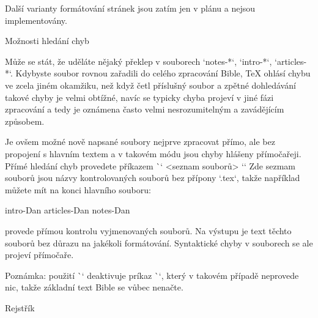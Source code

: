 Další varianty formátování stránek jsou zatím jen v plánu a nejsou
implementovány.


\sec Možnosti hledání chyb

Může se stát, že uděláte nějaký překlep v souborech `notes-*`, `intro-*`,
`articles-*`. Kdybyste soubor rovnou zařadili do celého zpracování Bible,
TeX ohlásí chybu ve zcela jiném okamžiku, než když četl příslušný soubor a
zpětné dohledávání takové chyby je velmi obtížné, navíc se typicky chyba
projeví v jiné fázi zpracování a tedy je oznámena často velmi
nesrozumitelným a zavádějícím způsobem.

Je ovšem možné nově napsané soubory nejprve zpracovat přímo, ale bez
propojení s hlavním textem a v takovém módu jsou chyby hlášeny přímočařeji.
Přímé hledání chyb provedete příkazem \`\checksyntax` <seznam souborů> `{}`
Zde sezmam souborů jsou názvy kontrolovaných souborů bez přípony `.tex`,
takže například můžete mít na konci hlavního souboru:

\begtt
\checksyntax intro-Dan articles-Dan notes-Dan {}
\endtt

provede přímou kontrolu vyjmenovaných souborů. Na výstupu je text těchto
souborů bez důrazu na jakékoli formátování. Syntaktické chyby v souborech se
ale projeví přímočaře.

Poznámka: použití \`\checksyntax` deaktivuje príkaz \`\processbooks`, který v
takovém případě neprovede nic, takže základní text Bible se vůbec nenačte.

\sec Rejstřík

\def\_sortinglang{en}
\typosize[9/]
\makeindex
\endmulti

\bye
